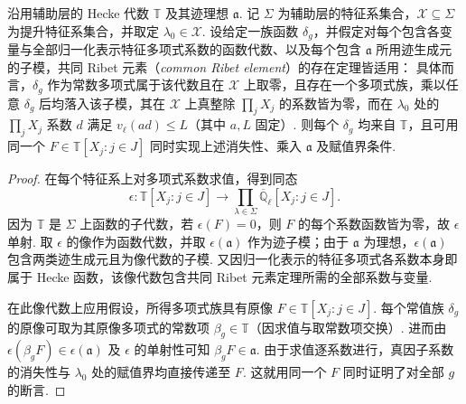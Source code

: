 \begin{lemma}
\label{lem:c-hecke-ribet-polynomial}
\emitthmsource
沿用辅助层的 Hecke 代数 $\mathbb T$ 及其迹理想 $\mathfrak a$.
记 $\Sigma$ 为辅助层的特征系集合，$\mathcal X\subseteq\Sigma$ 为提升特征系集合，并取定 $\lambda_0\in\mathcal X$.
设给定一族函数 $\delta_g$，并假定对每个包含各变量与全部归一化表示特征多项式系数的函数代数、以及每个包含 $\mathfrak a$ 所用迹生成元的子模，共同 Ribet 元素（\emph{common Ribet element}）的存在定理皆适用：
具体而言，$\delta_g$ 作为常数多项式属于该代数且在 $\mathcal X$ 上取零，且存在一个多项式族，乘以任意 $\delta_g$ 后均落入该子模，其在 $\mathcal X$ 上真整除 $\prod_jX_j$ 的系数皆为零，而在 $\lambda_0$ 处的 $\prod_jX_j$ 系数 $d$ 满足 $v_\ell(a d)\le L$（其中 $a,L$ 固定）.
则每个 $\delta_g$ 均来自 $\mathbb T$，且可用同一个 $F\in\mathbb T[X_j:j\in J]$ 同时实现上述消失性、乘入 $\mathfrak a$ 及赋值界条件.
\end{lemma}
\begin{proof}
在每个特征系上对多项式系数求值，得到同态
\[
 \epsilon:\mathbb T[X_j:j\in J]\longrightarrow
     \prod_{\lambda\in\Sigma}\overline{\mathbb Q}_\ell[X_j:j\in J].
\]
因为 $\mathbb T$ 是 $\Sigma$ 上函数的子代数，若 $\epsilon(F)=0$，则 $F$ 的每个系数函数皆为零，故 $\epsilon$ 单射.
取 $\epsilon$ 的像作为函数代数，并取 $\epsilon(\mathfrak a)$ 作为迹子模；由于 $\mathfrak a$ 为理想，$\epsilon(\mathfrak a)$ 包含两类迹生成元且为像代数的子模.
又因归一化表示的特征多项式各系数本身即属于 Hecke 函数，该像代数包含共同 Ribet 元素定理所需的全部系数与变量.

在此像代数上应用假设，所得多项式族具有原像 $F\in\mathbb T[X_j:j\in J]$.
每个常值族 $\delta_g$ 的原像可取为其原像多项式的常数项 $\beta_g\in\mathbb T$（因求值与取常数项交换）.
进而由 $\epsilon(\beta_gF)\in\epsilon(\mathfrak a)$ 及 $\epsilon$ 的单射性可知 $\beta_gF\in\mathfrak a$.
由于求值逐系数进行，真因子系数的消失性与 $\lambda_0$ 处的赋值界均直接传递至 $F$. 这就用同一个 $F$ 同时证明了对全部 $g$ 的断言.
\end{proof}

